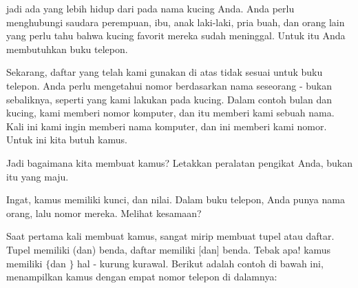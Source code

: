 jadi ada yang lebih hidup dari pada nama kucing Anda. Anda perlu menghubungi saudara perempuan, ibu, anak laki-laki, pria buah, dan orang lain yang perlu tahu bahwa kucing favorit mereka sudah meninggal. Untuk itu Anda membutuhkan buku telepon. \par
\vspace{12pt}
Sekarang, daftar yang telah kami gunakan di atas tidak sesuai untuk buku telepon. Anda perlu mengetahui nomor berdasarkan nama seseorang - bukan sebaliknya, seperti yang kami lakukan pada kucing. Dalam contoh bulan dan kucing, kami memberi nomor komputer, dan itu memberi kami sebuah nama. Kali ini kami ingin memberi nama komputer, dan ini memberi kami nomor. Untuk ini kita butuh kamus. \par
\vspace{12pt}
Jadi bagaimana kita membuat kamus? Letakkan peralatan pengikat Anda, bukan itu yang maju. \par
\vspace{12pt}
Ingat, kamus memiliki kunci, dan nilai. Dalam buku telepon, Anda punya nama orang, lalu nomor mereka. Melihat kesamaan? \par
\vspace{12pt}
Saat pertama kali membuat kamus, sangat mirip membuat tupel atau daftar. Tupel memiliki (dan) benda, daftar memiliki [dan] benda. Tebak apa! kamus memiliki  $  \{  $dan $  \}  $ hal - kurung kurawal. Berikut adalah contoh di bawah ini, menampilkan kamus dengan empat nomor telepon di dalamnya: \par
